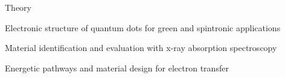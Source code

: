 

\begin{cventries}

  \cventry
  {}
  {}
  {Theory}
  {}
  {
    \begin{cvitems}
      \item{Electronic structure of quantum dots for green and spintronic applications}
      \item{Material identification and evaluation with x-ray absorption spectroscopy}
      \item{Energetic pathways and material design for electron transfer}
    \end{cvitems}
  }

\end{cventries}
